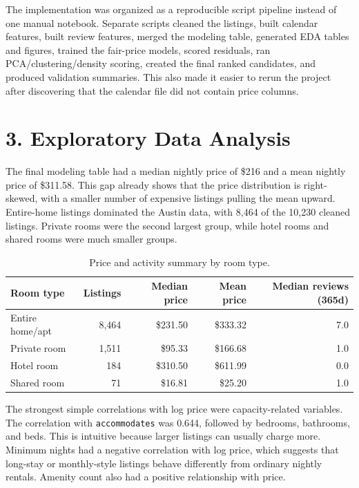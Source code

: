 \documentclass[11pt]{article}
\begin{document}
The implementation was organized as a reproducible script pipeline instead of one manual notebook. Separate scripts cleaned the listings, built calendar features, built review features, merged the modeling table, generated EDA tables and figures, trained the fair-price models, scored residuals, ran PCA/clustering/density scoring, created the final ranked candidates, and produced validation summaries. This also made it easier to rerun the project after discovering that the calendar file did not contain price columns.

\section*{3. Exploratory Data Analysis}

The final modeling table had a median nightly price of \$216 and a mean nightly price of \$311.58. This gap already shows that the price distribution is right-skewed, with a smaller number of expensive listings pulling the mean upward. Entire-home listings dominated the Austin data, with 8,464 of the 10,230 cleaned listings. Private rooms were the second largest group, while hotel rooms and shared rooms were much smaller groups.

\begin{table}[H]
\centering
\caption{Price and activity summary by room type.}
\small
\begin{tabular}{lrrrr}
\toprule
Room type & Listings & Median price & Mean price & Median reviews (365d) \\
\midrule
Entire home/apt & 8,464 & \$231.50 & \$333.32 & 7.0 \\
Private room & 1,511 & \$95.33 & \$166.68 & 1.0 \\
Hotel room & 184 & \$310.50 & \$611.99 & 0.0 \\
Shared room & 71 & \$16.81 & \$25.20 & 1.0 \\
\bottomrule
\end{tabular}
\end{table}

The strongest simple correlations with log price were capacity-related variables. The correlation with \texttt{accommodates} was 0.644, followed by bedrooms, bathrooms, and beds. This is intuitive because larger listings can usually charge more. Minimum nights had a negative correlation with log price, which suggests that long-stay or monthly-style listings behave differently from ordinary nightly rentals. Amenity count also had a positive relationship with price.
\end{document}
